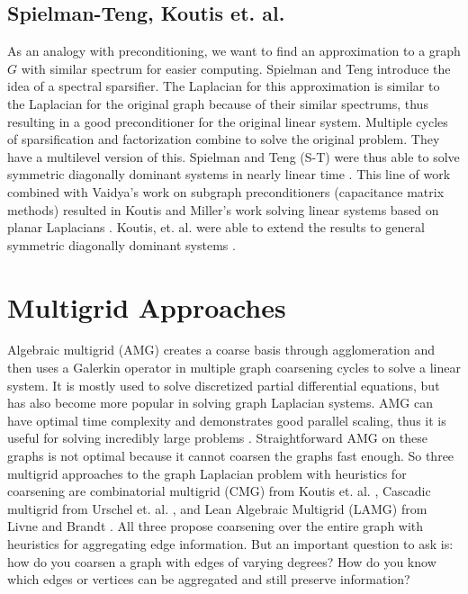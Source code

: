 \subsection{Spielman-Teng, Koutis et. al.}
As an analogy with preconditioning, we want to find an approximation to a graph $G$ with similar spectrum for easier computing. Spielman and Teng introduce the idea of a spectral sparsifier. The Laplacian for this approximation is similar to the Laplacian for the original graph because of their similar spectrums, thus resulting in a good preconditioner for the original linear system. Multiple cycles of sparsification and factorization combine to solve the original problem. They have a multilevel version of this. Spielman and Teng (S-T) were thus able to solve symmetric diagonally dominant systems in nearly linear time \cite{Spielman:2011}.  This line of work combined with Vaidya's \cite{Vaidya:1991} work on subgraph preconditioners (capacitance matrix methods) resulted in Koutis and Miller's work solving linear systems based on planar Laplacians \cite{Koutis:2007}. Koutis, et. al. were able to extend the results to general symmetric diagonally dominant systems \cite{Koutis:2010}.

\section{Multigrid Approaches}
Algebraic multigrid (AMG) creates a coarse basis through agglomeration and then uses a Galerkin operator in multiple graph coarsening cycles to solve a linear system. It is mostly used to solve discretized partial differential equations, but has also become more popular in solving graph Laplacian systems. AMG can have optimal time complexity and demonstrates good parallel scaling, thus it is useful for solving incredibly large problems \cite{Livne:2012}. Straightforward AMG on these graphs is not optimal because it cannot coarsen the graphs fast enough. So three multigrid approaches to the graph Laplacian problem with heuristics for coarsening are combinatorial multigrid (CMG) from Koutis et. al. \cite{Koutis:2011}, Cascadic multigrid from Urschel et. al. \cite{Urschel:2014}, and Lean Algebraic Multigrid (LAMG) from Livne and Brandt \cite{Livne:2012}. All three propose coarsening over the entire graph with heuristics for aggregating edge information. But an important question to ask is: how do you coarsen a graph with edges of varying degrees? How do you know which edges or vertices can be aggregated and still preserve information?


